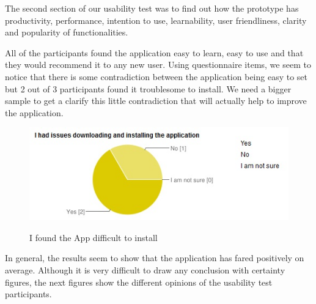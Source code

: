 The second section of our usability test was to find out how the prototype has productivity, performance, intention to use, learnability, user friendliness, clarity and popularity of functionalities.

All of the participants found the application easy to learn, easy to use and that they would recommend it to any new user. Using questionnaire items, we seem to notice that there is some contradiction between the application being easy to set but 2 out of 3 participants found it troublesome to install. We need a bigger sample to get a clarify this little contradiction that will actually help to improve the application.

\begin{figure}[htb]
    \centering
    \includegraphics[scale=0.7]{ut_pic/difficutltoinstall1.jpg}
    \label{Application installation}
    \caption{I found the App difficult to install}
\end{figure}

In general, the results seem to show that the application has fared positively on average. Although it is very difficult to draw any conclusion with certainty figures, the next figures show the different opinions of the usability test participants.

